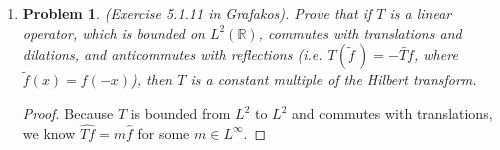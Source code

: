 \documentclass[a4paper]{article}
\newtheorem*{problem}{Problem}
\newcommand{\R}{\mathbb{R}}
\newcommand{\la}{\left \langle}
\newcommand{\ra}{\right \rangle}
\begin{document}
\begin{enumerate}
\begin{proof}
    Take any $\varphi \in \mathcal{S}$ and let $\psi \in \mathcal{C}^\infty(\R)$ be even with $\psi(x) = 0$ for $0 \leq |x| \leq \frac{1}{2}$, and $\psi(x) = 1$ for $|x| \geq 1$. We will
    use the standard dilation given by $\psi_\varepsilon(x) = \psi \left( \frac{x}{\varepsilon} \right)$. We will abuse notation slightly and use
    $\psi(x)$ to mean $\psi(|x|)$. Using this, we can write
    \begin{align*}
      \la \partial_j |x|^{-n+1} , \varphi \ra &= \la \psi_\varepsilon \partial_j |x|^{-n+1}, \varphi \ra + \la (1-\psi_\varepsilon) \partial_j |x|^{-n+1}, \varphi \ra \\
      &=  \la \partial_j |x|^{-n+1}, \psi_\varepsilon \varphi \ra - \la |x|^{-n+1}, \partial_j \left[ (1 - \psi_\varepsilon) \varphi \right] \ra \\
    \end{align*}

    In the first term, we see $\psi_\varepsilon \varphi$ is supported away from 0, so we are able to take the derivative of $|x|^{-n+1}$ to get
    \begin{align*}
      \la \partial_j |x|^{-n+1}, \psi_\varepsilon \varphi \ra &= \la (1-n) \frac{x_j}{|x|^{n+1}}, \psi_\varepsilon \varphi \ra \\
      &= \int_{|x|>\varepsilon}^{} (1-n) \frac{x_j}{|x|^{n+1}} \varphi dx + \int_{\frac{\varepsilon}{2} \leq |x| \leq \varepsilon}^{}
      \frac{x_j}{|x|^{n+1}} \psi_\varepsilon \varphi dx
    \end{align*}

    As we take $\varepsilon \to 0$, we will have the second term go to 0, leaving
    \[ \la \partial_j |x|^{-n+1}, \psi_\varepsilon \varphi \ra = \la (1-n) \textup{ p.v. } \frac{x_j}{|x|^{n+1}}, \varphi \ra .\]

  \end{proof}

\item
  \begin{problem}
    (Exercise 5.1.11 in Grafakos). Prove that if $T$ is a linear operator, which is bounded on $L^2 (\mathbb R)$, commutes with translations and dilations, and anticommutes with reflections (i.e. $ T (\widetilde{f}\,) = - \widetilde{Tf}$, where $\widetilde{f} (x) = f (-x)$), then $T$ is a constant multiple of the Hilbert transform.
  \end{problem}

  \begin{proof}

    Because $T$ is bounded from $L^2$ to $L^2$ and commutes with translations, we know $\widehat{Tf} = m \widehat{f}$ for some $m \in L^\infty$.


\end{proof}
\end{enumerate}
\end{document}
